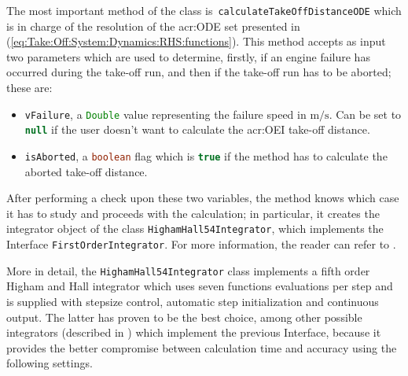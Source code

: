 \bigskip
\noindent
The most important method of the class is~\lstinline[language=Java]!calculateTakeOffDistanceODE! which is in charge of the resolution of the \gls{acr:ODE} set presented in (\ref{eq:Take:Off:System:Dynamics:RHS:functions}). This method accepts as input two parameters which are used to determine, firstly, if an engine failure has occurred during the take-off run, and then if the take-off run has to be aborted; these are:
%
\begin{itemize}
\item \lstinline[language=Java]!vFailure!, a \lstinline[language=Java]!Double! value representing the failure speed in $\si{\meter\per\second}$. Can be set to \lstinline[language=Java]!null! if the user doesn't want to calculate the \gls{acr:OEI} take-off distance. 
\item \lstinline[language=Java]!isAborted!, a \lstinline[language=Java]!boolean! flag which is \lstinline[language=Java]!true! if the method has to calculate the aborted take-off distance.
\end{itemize}
%
After performing a check upon these two variables, the method knows which case it has to study and proceeds with the calculation; in particular, it creates the integrator object of the class \lstinline[language=Java]!HighamHall54Integrator!, which implements the \gls{Interface} \lstinline[language=Java]!FirstOrderIntegrator!. For more information, the reader can refer to \cite{apache:ode}.

\bigskip
\noindent
More in detail, the \lstinline[language=Java]!HighamHall54Integrator! class implements a fifth order Higham and Hall integrator which uses seven functions evaluations per step and is supplied with stepsize control, automatic step initialization and continuous output. The latter has proven to be the best choice, among other possible integrators (described in \cite{apache:FirstOrderIntegrator}) which implement the previous \gls{Interface}, because it provides the better compromise between calculation time and accuracy using the following settings.

